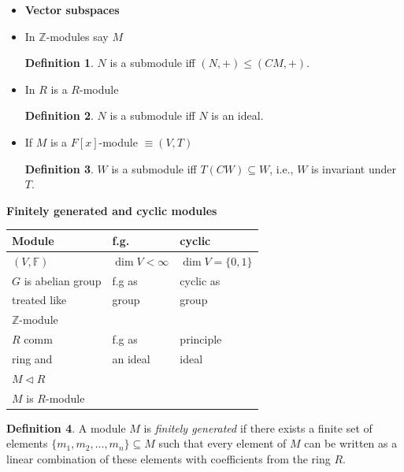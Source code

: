\documentclass[11pt]{article}
\theoremstyle{definition}
\newtheorem{definition}{Definition}[section]
\theoremstyle{remark}
\begin{document}
\begin{itemize}
    \item \textbf{Vector subspaces}

    \item In $\mathbb{Z}$-modules say $M$
    \begin{definition}\label{def:submodule_Z}
        $N$ is a submodule iff $(N, +) \leq (CM, +)$.
    \end{definition}

    \item In $R$ is a $R$-module
    \begin{definition}\label{def:submodule_R}
        $N$ is a submodule iff $N$ is an ideal.
    \end{definition}

    \item If $M$ is a $F[x]$-module $\equiv (V, T)$
    \begin{definition}\label{def:submodule_Fx}
        $W$ is a submodule iff $T(CW) \subseteq W$, i.e., $W$ is invariant under $T$.
    \end{definition}
\end{itemize}

\begin{center}
\textbf{Finitely generated and cyclic modules}
\end{center}

\begin{tabular}{|l|l|l|}
\hline
\textbf{Module} & \textbf{f.g.} & \textbf{cyclic} \\ \hline
$(V, \mathbb{F})$ & $\dim V < \infty$ & $\dim V = \{0, 1\}$ \\ \hline
$G$ is abelian group & f.g as & cyclic as \\
treated like & group & group \\
$\mathbb{Z}$-module & & \\ \hline
$R$ comm & f.g as & principle \\
ring and & an ideal & ideal \\
$M \triangleleft R$ & & \\
$M$ is $R$-module & & \\ \hline
\end{tabular}

\begin{definition}\label{def:finitely_generated_module}
A module $M$ is \textit{finitely generated} if there exists a finite set of elements $\{m_1, m_2, \dots, m_n\} \subseteq M$ such that every element of $M$ can be written as a linear combination of these elements with coefficients from the ring $R$.
\end{definition}
\end{document}
